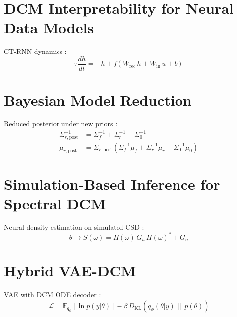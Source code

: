\section{DCM Interpretability for Neural Data Models}

CT-RNN dynamics \citep{langdon2025}:
\begin{equation}
  \tau \frac{dh}{dt} = -h + f(W_\text{rec}\, h + W_\text{in}\, u + b)
  \label{eq:ctrnn}
\end{equation}

\section{Bayesian Model Reduction}

Reduced posterior under new priors \citep{friston2011bmr}:
\begin{align}
  \Sigma_{r,\text{post}}^{-1}
    &= \Sigma_f^{-1} + \Sigma_r^{-1} - \Sigma_0^{-1}
    \label{eq:bmr-cov} \\
  \mu_{r,\text{post}}
    &= \Sigma_{r,\text{post}}
       (\Sigma_f^{-1}\mu_f + \Sigma_r^{-1}\mu_r - \Sigma_0^{-1}\mu_0)
    \label{eq:bmr-mean}
\end{align}

\section{Simulation-Based Inference for Spectral DCM}

Neural density estimation on simulated CSD \citep{goncalves2020}:
\begin{equation}
  \theta \mapsto S(\omega) = H(\omega)\,G_u\,H(\omega)^* + G_n
  \label{eq:sbi-simulator}
\end{equation}

\section{Hybrid VAE-DCM}

VAE with DCM ODE decoder \citep{kingma2014}:
\begin{equation}
  \mathcal{L} = \mathbb{E}_{q_\phi}[\ln p(y|\theta)]
    - \beta\, D_\text{KL}(q_\phi(\theta|y)\,\|\,p(\theta))
  \label{eq:vae-elbo}
\end{equation}

